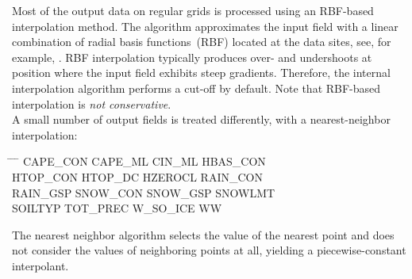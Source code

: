 Most of the output data on regular grids is processed using an RBF-based interpolation method.
The algorithm  approximates the input field with a linear combination of 
radial basis functions~(RBF) located at the data sites, see, for example, \cite{Ruppert2007}.
RBF interpolation typically produces over- and undershoots at position where the input field
exhibits steep gradients.
Therefore, the internal interpolation algorithm performs a cut-off by default.
Note that RBF-based interpolation is \emph{not conservative}.\\

A small number of output fields is treated differently, with a nearest-neighbor interpolation:
\begin{tabbing}
  \hspace{0.2\textwidth} \= \hspace{0.2\textwidth} \= \hspace{0.2\textwidth} \= \hspace{0.2\textwidth} \kill
  CAPE\_CON  \>
  CAPE\_ML   \>
  CIN\_ML    \>
  HBAS\_CON  \\
  HTOP\_CON  \>
  HTOP\_DC   \>  
  HZEROCL    \>
  RAIN\_CON  \\
  RAIN\_GSP  \>   
  SNOW\_CON  \>
  SNOW\_GSP  \>
  SNOWLMT    \\
  SOILTYP    \>
  TOT\_PREC  \>
  W\_SO\_ICE \>
  WW   
\end{tabbing}
The nearest neighbor algorithm selects the value of the nearest point and does
not consider the values of neighboring points at all, yielding a piecewise-constant interpolant. 



%  

